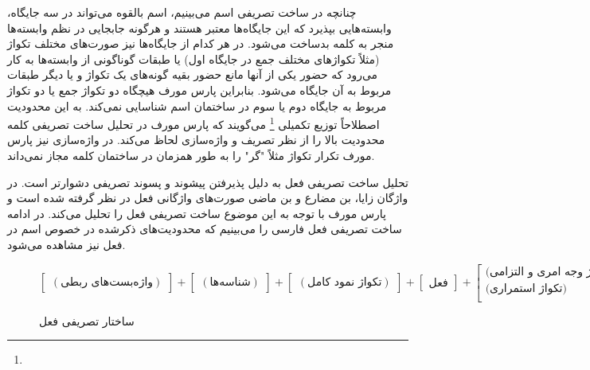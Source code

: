 \documentclass[12pt,onecolumn,a4paper]{article}
\begin{document}
    \par
    چنانچه در ساخت تصریفی اسم می‌بینیم، اسم بالقوه می‌تواند در سه جایگاه، وابسته‌هایی بپذیرد که این جایگاه‌ها معتبر هستند و هرگونه جابجایی در نظم وابسته‌ها منجر به کلمه بدساخت می‌شود. در هر کدام از جایگاه‌ها نیز صورت‌های مختلف تکواژ (مثلاً تکواژهای مختلف جمع در جایگاه اول) یا طبقات گوناگونی از وابسته‌ها به کار می‌رود که حضور یکی از آنها مانع حضور بقیه گونه‌های یک تکواژ و یا دیگر طبقات مربوط به آن جایگاه می‌شود. بنابراین پارس مورف هیچگاه دو تکواژ جمع یا دو تکواژ مربوط به جایگاه دوم یا سوم در ساختمان اسم شناسایی نمی‌کند. به این محدودیت اصطلاحاً توزیع تکمیلی \footnote{} می‌گویند که پارس مورف در تحلیل ساخت تصریفی کلمه محدودیت بالا را از نظر تصریف و واژه‌سازی لحاظ می‌کند. در واژه‌سازی نیز پارس مورف تکرار تکواژ مثلاً "گر" را به طور همزمان در ساختمان کلمه مجاز نمی‌داند.

    \par
    تحلیل ساخت تصریفی فعل به دلیل پذیرفتن پیشوند و پسوند تصریفی دشوارتر است. در واژگان زایا، بن مضارع و بن ماضی صورت‌های واژگانی فعل در نظر گرفته شده است و پارس مورف با توجه به این موضوع ساخت تصریفی فعل را تحلیل می‌کند. در ادامه ساخت تصریفی فعل فارسی را می‌بینیم که محدودیت‌های ذکرشده در خصوص اسم در فعل نیز مشاهده می‌شود.

    \begin{figure}[hp]
        \[
            \begin{bmatrix}
                (\textrm{واژه‌بست‌های ربطی})
            \end{bmatrix}
            +
            \begin{bmatrix}
                (\textrm{شناسه‌ها})
            \end{bmatrix}
            +
            \begin{bmatrix}
                (\textrm{تکواژ نمود کامل})
            \end{bmatrix}
            +
            \begin{bmatrix}
                \textrm{فعل}
            \end{bmatrix}
            +
            \begin{bmatrix}
                \textrm{(تکواژ وجه امری و التزامی)} \\
                \textrm{(تکواژ استمراری)} \\
            \end{bmatrix}
            +
            \begin{bmatrix}
                \textrm{تکواژ نفی}
            \end{bmatrix}
        \]
        \caption{ساختار تصریفی فعل {\mfo\citep{Eslami88}}}
    \end{figure}
\end{document}

